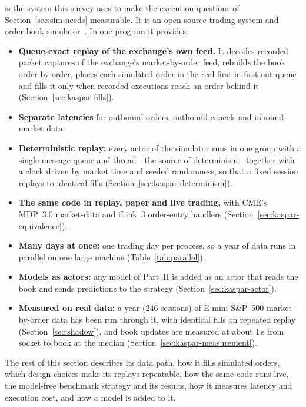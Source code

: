 \kasparhft{} is the system this survey uses to make the execution questions of Section~\ref{sec:sim-needs} measurable. It
is an open-source trading system and order-book simulator~\citep{kaspar_hft,maciejewski_shadow}. In one program it provides:
\begin{itemize}[leftmargin=1.5em,itemsep=1pt]
\item \textbf{Queue-exact replay of the exchange's own feed.} It decodes recorded packet captures of the exchange's
  market-by-order feed, rebuilds the book order by order, places each simulated order in the real first-in-first-out
  queue and fills it only when recorded executions reach an order behind it (Section~\ref{sec:kaspar-fills}).
\item \textbf{Separate latencies} for outbound orders, outbound cancels and inbound market data.
\item \textbf{Deterministic replay:} every actor of the simulator runs in one group with a single message queue and
  thread---the source of determinism---together with a clock driven by market time and seeded randomness, so that a fixed
  session replays to identical fills (Section~\ref{sec:kaspar-determinism}).
\item \textbf{The same code in replay, paper and live trading,} with CME's MDP~3.0 market-data and iLink~3 order-entry
  handlers (Section~\ref{sec:kaspar-equivalence}).
\item \textbf{Many days at once:} one trading day per process, so a year of data runs in parallel on one large
  machine (Table~\ref{tab:parallel}).
\item \textbf{Models as actors:} any model of Part~II is added as an actor that reads the book and sends predictions
  to the strategy (Section~\ref{sec:kaspar-actor}).
\item \textbf{Measured on real data:} a year (246 sessions) of E-mini S\&P~500 market-by-order data has been run
  through it, with identical fills on repeated replay (Section~\ref{sec:shadow}), and book updates are measured at about
  1\,\textmu s from socket to book at the median (Section~\ref{sec:kaspar-measurement}).
\end{itemize}
The rest of this section describes its data path, how it fills simulated orders, which design choices make its replays
repeatable, how the same code runs live, the model-free benchmark strategy and its results, how it measures latency
and execution cost, and how a model is added to it.

